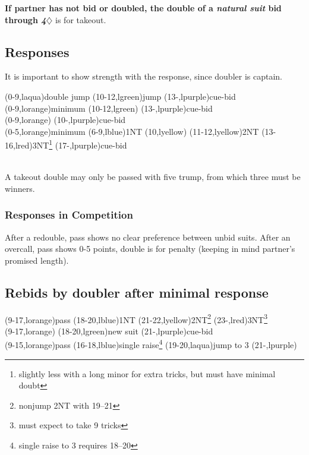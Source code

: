 \documentclass[oneside]{memoir}
\def\D{$\diamondsuit$}
\begin{document}
\textbf{If partner has not bid or doubled,
the double of a \emph{natural suit} bid through \emph{4\D}} is for takeout.

\subsection{Responses}
It is important to show strength with the response, since doubler is
captain.

\begin{ptable}
  \bid(0-9,laqua){double jump}
  \bid*(10-12,lgreen){jump}
  \bid*(13-,lpurple){cue-bid}\\
  \bid*(0-9,lorange){minimum}
  \bid(10-12,lgreen){}
  \bid(13-,lpurple){cue-bid}\\
  \bid(0-9,lorange){}
  \bid*(10-,lpurple){cue-bid}\\
  \bid*(0-5,lorange){minimum}
  \bid(6-9,lblue){1NT}
  \bid(10,lyellow){\hskip-7pt\colorbox{lblue}{\hskip 10pt}}
  \bid(11-12,lyellow){2NT}
  \bid(13-16,lred){3NT\footnote{slightly less with a long minor for extra tricks, but must have minimal doubt}}
  \bid*(17-,lpurple){cue-bid}\\
\end{ptable}\\
A takeout double may only be passed with five trump, from which
three must be winners.

\subsubsection{Responses in Competition}
After a redouble, pass shows no clear preference between unbid suits.
After an overcall, pass shows 0-5 points, double is for penalty (keeping
in mind partner's promised length).

\subsection{Rebids by doubler after minimal response}

\begin{ptable}
  \bid*(9-17,lorange){pass}
  \bid(18-20,lblue){1NT}
  \bid(21-22,lyellow){2NT\footnote{nonjump 2NT with 19--21}}
  \bid(23-,lred){3NT\footnote{must expect to take 9 tricks}}\\
  \bid(9-17,lorange){}
  \bid(18-20,lgreen){new suit}
  \bid*(21-,lpurple){cue-bid}\\
  \bid*(9-15,lorange){pass}
  \bid(16-18,lblue){single raise\footnote{single raise to 3 requires 18--20}}
  \bid(19-20,laqua){jump to 3}
  \bid(21-,lpurple){}\\
\end{ptable}
\end{document}
